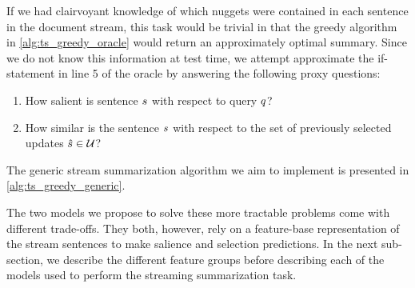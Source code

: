 


If we had clairvoyant knowledge of which nuggets were contained in each
sentence in the document stream,
this task would be trivial in that the greedy algorithm in 
\autoref{alg:ts_greedy_oracle} would return an approximately optimal summary.
Since we do not know this information at test time, we attempt approximate
the if-statement in line 5 of the oracle by answering the following proxy 
questions:
\begin{enumerate}
    \item How salient is sentence $s$ with respect to query $q$?
    \item How similar is the sentence $s$ with respect to the set of 
            previously selected updates $\hat{s} \in \mathcal{U}$?
\end{enumerate}
The generic stream summarization algorithm we aim to implement is presented
in \autoref{alg:ts_greedy_generic}.

The two models we propose to solve these more tractable problems come with
different trade-offs. They both, however, rely on a feature-base 
representation of the stream sentences to make salience and selection 
predictions. In the next sub-section, we describe the different feature
groups before describing each of the models used to perform the streaming
summarization task.
